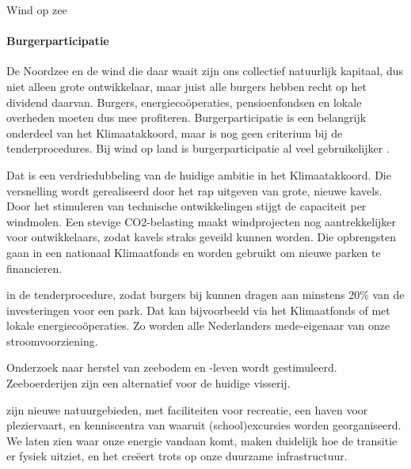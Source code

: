\begin{voorstel}{Wind op zee}
\begin{overwegingen}
\paragraph{Burgerparticipatie}
De Noordzee en de wind die daar waait zijn ons collectief natuurlijk kapitaal, dus niet alleen grote ontwikkelaar, maar juist alle burgers hebben recht op het dividend daarvan. Burgers, energiecoöperaties, pensioenfondsen en lokale overheden moeten dus mee profiteren. Burgerparticipatie is een belangrijk onderdeel van het Klimaatakkoord, maar is nog geen criterium bij de tenderprocedures. Bij wind op land is burgerparticipatie al veel gebruikelijker \parencite{nwea_gedragscode_2016}.

\end{overwegingen}


\begin{aanbevelingen}

Dat is een verdriedubbeling van de huidige ambitie in het Klimaatakkoord. Die versnelling wordt gerealiseerd door het rap uitgeven van grote, nieuwe kavels. Door het stimuleren van technische ontwikkelingen stijgt de capaciteit per windmolen. Een stevige CO2-belasting maakt windprojecten nog aantrekkelijker voor ontwikkelaars, zodat kavels straks geveild kunnen worden. Die opbrengsten gaan in een nationaal Klimaatfonds en worden gebruikt om nieuwe parken te financieren.

 in de tenderprocedure, zodat burgers bij kunnen dragen aan minstens 20\% van de investeringen voor een park.
Dat kan bijvoorbeeld via het Klimaatfonds of met lokale energiecoöperaties. Zo worden alle Nederlanders mede-eigenaar van onze stroomvoorziening.

Onderzoek naar herstel van zeebodem en -leven wordt gestimuleerd. Zeeboerderijen zijn een alternatief voor de huidige visserij.

 zijn nieuwe natuurgebieden, met faciliteiten voor recreatie, een haven voor pleziervaart, en kenniscentra van waaruit (school)excursies worden georganiseerd.
We laten zien waar onze energie vandaan komt, maken duidelijk hoe de transitie er fysiek uitziet, en het creëert trots op onze duurzame infrastructuur.

\end{aanbevelingen}

\end{voorstel}